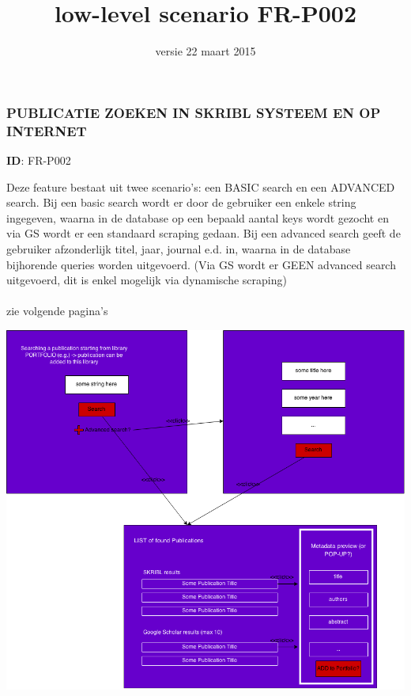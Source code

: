 \documentclass{article}
\begin{document}
\date{versie 22 maart 2015}
\title{low-level scenario FR-P002}
\maketitle


\subsubsection*{PUBLICATIE ZOEKEN IN SKRIBL SYSTEEM EN OP INTERNET}
\vspace{2 mm}

\textbf{ID}: FR-P002
\vspace{2 mm}


\noindent Deze feature bestaat uit twee scenario's: een BASIC search en een ADVANCED search. Bij een basic search wordt er door de gebruiker een enkele string ingegeven, waarna in de database op een bepaald aantal keys wordt gezocht en via GS wordt er een standaard scraping gedaan. Bij een advanced search geeft de gebruiker afzonderlijk titel, jaar, journal e.d. in, waarna in de database bijhorende queries worden uitgevoerd. (Via GS wordt er GEEN advanced search uitgevoerd, dit is enkel mogelijk via dynamische scraping)
\\
\\
zie volgende pagina's

\includegraphics[width=1.3\textwidth]{basic-advanced-search.png}
\end{document}
